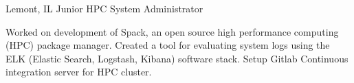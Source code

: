 
        {Lemont, IL}
        {Junior HPC System Administrator}
        {}{
    
    Worked on development of Spack, an open source high performance computing (HPC) package manager. Created a tool for evaluating system logs using the ELK (Elastic Search, Logstash, Kibana) software stack. Setup Gitlab Continuous integration server for HPC cluster.
    
}
